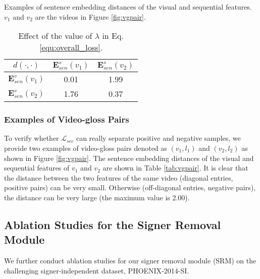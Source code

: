 \documentclass[acmsmall,screen]{acmart}
\def \mbf{\mathbf}
\begin{document}
\begin{table}[t]
\begin{minipage}{.5\linewidth}
    \caption{Examples of sentence embedding distances of the visual and sequential features. $v_1$ and $v_2$ are the videos in Figure \ref{fig:vgpair}.}
    \centering
    \begin{tabular}{c|cc}
    	\toprule
        $d(\cdot,\cdot)$ & $\mbf{E}_{sen}^s(v_1)$ & $\mbf{E}_{sen}^s(v_2)$ \\
        \midrule
        $\mbf{E}_{sen}^v(v_1)$ & 0.01 & 1.99 \\
        $\mbf{E}_{sen}^v(v_2)$ & 1.76 & 0.37 \\
        \bottomrule
    \end{tabular}
    \label{tab:vgpair}
    \end{minipage}\begin{minipage}{.5\linewidth}
    \centering
    \vspace{20pt}
\caption{Effect of the value of $\lambda$ in Eq. \ref{equ:overall_loss}.}
    \label{tab:lambda}
    \end{minipage}
\end{table} 
\subsubsection{Examples of Video-gloss Pairs}
To verify whether $\mathcal{L}_{sec}$ can really separate positive and negative samples, we provide two examples of video-gloss pairs denoted as $(v_1, l_1)$ and $(v_2, l_2)$ as shown in Figure \ref{fig:vgpair}.
The sentence embedding distances of the visual and sequential features of $v_1$ and $v_2$ are shown in Table \ref{tab:vgpair}. 
It is clear that the distance between the two features of the same video (diagonal entries, positive pairs) can be very small. 
Otherwise (off-diagonal entries, negative pairs), the distance can be very large (the maximum value is 2.00).


\subsection{Ablation Studies for the Signer Removal Module}
We further conduct ablation studies for our signer removal module (SRM) on the challenging signer-independent dataset, PHOENIX-2014-SI.
\end{document}
